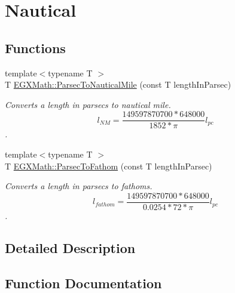 \hypertarget{group___e_g_x_math-_conversions-_length_conversions-_astronomical-_parsec-_nautical}{}\section{Nautical}
\label{group___e_g_x_math-_conversions-_length_conversions-_astronomical-_parsec-_nautical}
\subsection*{Functions}
\begin{DoxyCompactItemize}
\item 
{\footnotesize template$<$typename T $>$ }\\T \mbox{\hyperlink{group___e_g_x_math-_conversions-_length_conversions-_astronomical-_parsec-_nautical_ga34adb714e6f4da104b25e2b5a2ab114e}{E\+G\+X\+Math\+::\+Parsec\+To\+Nautical\+Mile}} (const T length\+In\+Parsec)
\begin{DoxyCompactList}\small\item\em Converts a length in parsecs to nautical mile. \[ l_{NM}= \frac{149597870700 * 648000}{1852 * \pi} l_{pc} \]. \end{DoxyCompactList}\item 
{\footnotesize template$<$typename T $>$ }\\T \mbox{\hyperlink{group___e_g_x_math-_conversions-_length_conversions-_astronomical-_parsec-_nautical_gab621169a5b3794b8405b4b0bca2b6092}{E\+G\+X\+Math\+::\+Parsec\+To\+Fathom}} (const T length\+In\+Parsec)
\begin{DoxyCompactList}\small\item\em Converts a length in parsecs to fathoms. \[ l_{fathom}= \frac{149597870700 * 648000}{0.0254 * 72 * \pi} l_{pc} \]. \end{DoxyCompactList}\end{DoxyCompactItemize}


\subsection{Detailed Description}


\subsection{Function Documentation}
\mbox{\label{group___e_g_x_math-_conversions-_length_conversions-_astronomical-_parsec-_nautical_gab621169a5b3794b8405b4b0bca2b6092}} 
